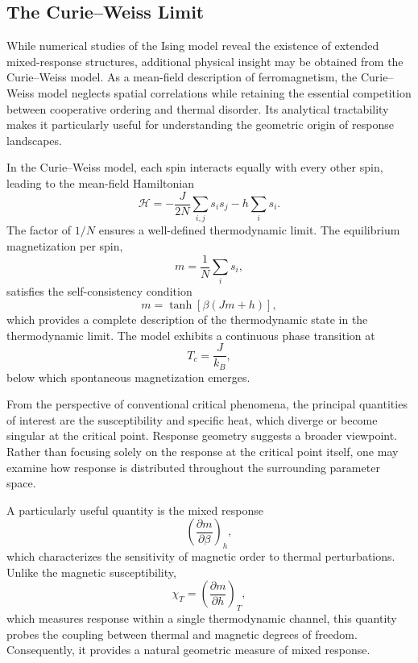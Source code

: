 \subsection{The Curie--Weiss Limit}

While numerical studies of the Ising model reveal the existence of
extended mixed-response structures, additional physical insight may be
obtained from the Curie--Weiss model. As a mean-field description of
ferromagnetism, the Curie--Weiss model neglects spatial correlations
while retaining the essential competition between cooperative ordering
and thermal disorder. Its analytical tractability makes it particularly
useful for understanding the geometric origin of response landscapes.

In the Curie--Weiss model, each spin interacts equally with every other
spin, leading to the mean-field Hamiltonian
%
\begin{equation}
\mathcal{H}
=
-\frac{J}{2N}
\sum_{i,j}
s_i s_j
-
h
\sum_i s_i .
\end{equation}
%
The factor of \(1/N\) ensures a well-defined thermodynamic limit. The
equilibrium magnetization per spin,
%
\begin{equation}
m
=
\frac{1}{N}
\sum_i s_i ,
\end{equation}
%
satisfies the self-consistency condition
%
\begin{equation}
m=
\tanh\!\left[\beta(Jm+h)\right],
\end{equation}
%
which provides a complete description of the thermodynamic state in
the thermodynamic limit. The model exhibits a continuous phase
transition at
%
\begin{equation}
T_c
=
\frac{J}{k_B},
\end{equation}
%
below which spontaneous magnetization emerges.

From the perspective of conventional critical phenomena, the principal
quantities of interest are the susceptibility and specific heat, which
diverge or become singular at the critical point. Response geometry
suggests a broader viewpoint. Rather than focusing solely on the
response at the critical point itself, one may examine how response is
distributed throughout the surrounding parameter space.

A particularly useful quantity is the mixed response
%
\begin{equation}
\left(
\frac{\partial m}
{\partial \beta}
\right)_h ,
\end{equation}
%
which characterizes the sensitivity of magnetic order to thermal
perturbations. Unlike the magnetic susceptibility,
%
\begin{equation}
\chi_T
=
\left(
\frac{\partial m}
{\partial h}
\right)_T ,
\end{equation}
%
which measures response within a single thermodynamic channel, this
quantity probes the coupling between thermal and magnetic degrees of
freedom. Consequently, it provides a natural geometric measure of
mixed response.

